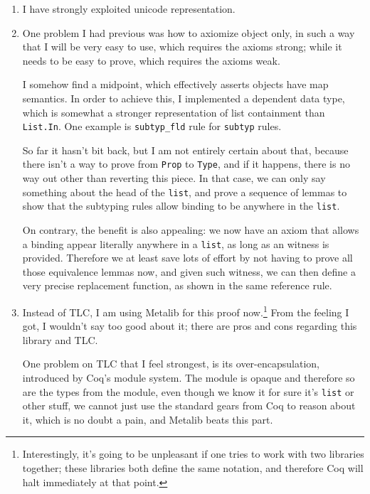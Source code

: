 \documentclass{article}
\theoremstyle{definition}
\begin{document}
\begin{enumerate}
\item I have strongly exploited unicode representation.
\item One problem I had previous was how to axiomize object only, in such a way that I
  will be very easy to use, which requires the axioms strong; while it needs to be
  easy to prove, which requires the axioms weak.

  I somehow find a midpoint, which effectively asserts objects have map semantics. In
  order to achieve this, I implemented a dependent data type, which is somewhat a
  stronger representation of list containment than \texttt{List.In}. One example is
  \texttt{subtyp\_fld} rule for \texttt{subtyp} rules\cite[Definition.v, 421]{source}.

  So far it hasn't bit back, but I am not entirely certain about that, because there
  isn't a way to prove from \texttt{Prop} to \texttt{Type}, and if it happens, there
  is no way out other than reverting this piece. In that case, we can only say
  something about the head of the \texttt{list}, and prove a sequence of lemmas to
  show that the subtyping rules allow binding to be anywhere in the \texttt{list}.

  On contrary, the benefit is also appealing: we now have an axiom that allows a
  binding appear literally anywhere in a \texttt{list}, as long as an witness is
  provided. Therefore we at least save lots of effort by not having to prove all those
  equivalence lemmas now, and given such witness, we can then define a very precise
  replacement function, as shown in the same reference rule.

\item Instead of TLC, I am using Metalib for this proof
  now\cite{metalib}.\footnote{Interestingly, it's going to be unpleasant if one tries
    to work with two libraries together; these libraries both define the same
    notation, and therefore Coq will halt immediately at that point.} From the feeling
  I got, I wouldn't say too good about it; there are pros and cons regarding this
  library and TLC.

  One problem on TLC that I feel strongest, is its over-encapsulation, introduced by
  Coq's module system. The module is opaque and therefore so are the types from the
  module, even though we know it for sure it's \texttt{list} or other stuff, we cannot
  just use the standard gears from Coq to reason about it, which is no doubt a pain,
  and Metalib beats this part.


\end{enumerate}
\end{document}
